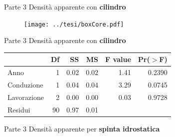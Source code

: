 \documentclass[10pt]{beamer}
\begin{document}

\begin{frame}
\end{frame}


\begin{frame}[label=Core]{Parte 3 \small{Densità apparente con \bf{cilindro}}}
  \hyperlink{finale}{}  
  \begin{figure}
    \texttt{[image: ../tesi/boxCore.pdf]}
  \end{figure}
\end{frame}

\begin{frame}{Parte 3 \small{Densità apparente con \bf{cilindro}} }
  \begin{table}[ht]
    \centering
    \label{tab:anova del modello}
    \begin{tabular}{lrrrrr}
      \hline
      & Df & SS & MS & F value & Pr($>$F) \\ 
      \hline 
      Anno         & 1  &  0.02  &  0.02  &   1.41   & 0.2390   \\ 
      Conduzione   & 1  &  0.04  &  0.04  &   3.29   & 0.0745   \\ 
      Lavorazione  & 2  &  0.00  &  0.00  &   0.03   & 0.9728   \\ 
      Residui      & 90 &  0.97  &  0.01  &          &          \\ 
      \hline
    \end{tabular}
  \end{table}
\end{frame}

\begin{frame}[label=Clod]{Parte 3 \small{Densità apparente per \bf{spinta
        idrostatica}}} 
  \hyperlink{finale}{}
\end{frame}
\end{document}
